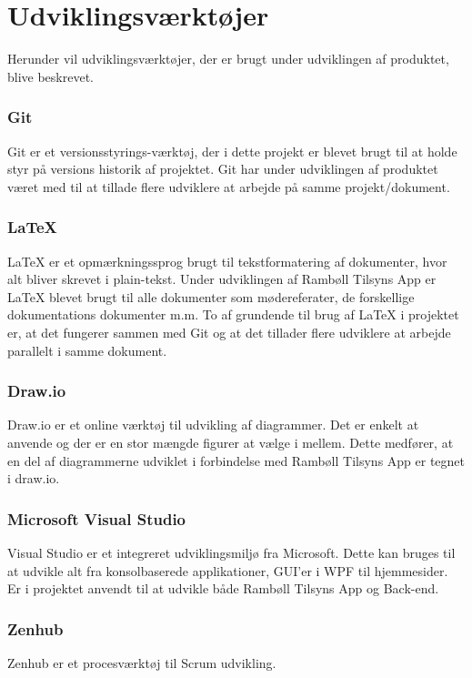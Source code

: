 \chapter{Udviklingsværktøjer}
Herunder vil udviklingsværktøjer, der er brugt under udviklingen af 
produktet, blive beskrevet.

\subsection*{Git}
Git\cite{GitRef} er et versionsstyrings-værktøj, der i dette projekt er 
blevet brugt til at holde styr på versions historik af projektet. Git har under 
udviklingen af produktet været med til at tillade flere udviklere at 
arbejde på samme projekt/dokument.

\subsection*{\LaTeX}
\LaTeX \cite{LatexRef} er et opmærkningssprog brugt til tekstformatering af 
dokumenter, hvor alt bliver skrevet i plain-tekst. Under udviklingen af 
Rambøll Tilsyns App er LaTeX blevet brugt til alle dokumenter som 
mødereferater, de forskellige dokumentations dokumenter m.m. To af grundende til brug af LaTeX i 
projektet er, at det fungerer sammen med Git og at det tillader flere 
udviklere at arbejde parallelt i samme dokument.

\subsection*{Draw.io}
Draw.io\cite{Draw.io} er et online værktøj til udvikling af diagrammer. 
Det er enkelt at anvende og der er en stor mængde figurer at vælge i mellem. Dette medfører, at en del af diagrammerne udviklet i forbindelse med Rambøll Tilsyns App er tegnet i draw.io.

\subsection*{Microsoft Visual Studio}
Visual Studio\cite{VisualStudio} er et integreret udviklingsmiljø fra 
Microsoft. Dette kan bruges til at udvikle alt fra konsolbaserede 
applikationer, GUI'er i WPF til hjemmesider. Er i projektet anvendt til at 
udvikle både Rambøll Tilsyns App og Back-end.

\subsection*{Zenhub}
Zenhub \cite{Zenhub} er et procesværktøj til Scrum udvikling.

